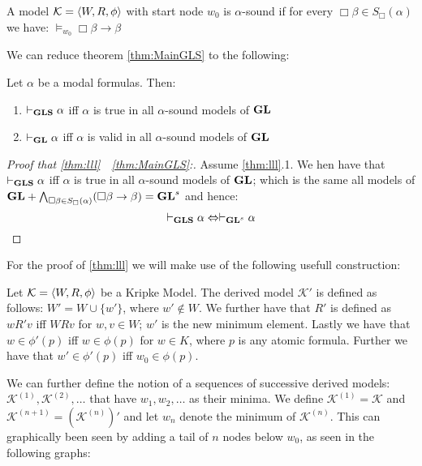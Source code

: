 \documentclass[../main.tex]{subfiles}
\begin{document}
\begin{defi}
	A model $\mathcal{K}=\langle W,R,\phi\rangle$ with start node $w_0$ is $\alpha$-sound if for every
	$\Box\beta\in S_\Box(\alpha)$  we have:
	$\vDash_{w_0}\Box\beta\rightarrow\beta$
\end{defi}
We can reduce theorem \ref{thm:MainGLS} to the following:
\begin{thm}
	\label{thm:lll}
	Let $\alpha$ be a modal formulas. Then:
	\begin{enumerate}
		\item $\vdash_{\text{\textbf{GLS}}}\alpha$ iff $\alpha$ is true in all
			$\alpha$-sound models of $\text{\textbf{GL}}$
		\item $\vdash_{\text{\textbf{GL}}}\alpha$ iff $\alpha$ is valid in all
			$\alpha$-sound models of $\text{\textbf{GL}}$
	\end{enumerate}
\end{thm}
\begin{proof}[Proof that \ref{thm:lll}\ \Rightarrow\ \ref{thm:MainGLS}:]
	Assume \ref{thm:lll}.1. We hen have that $\vdash_{\text{\textbf{GLS}}}\alpha$ iff $\alpha$ is true in all
	$\alpha$-sound models of $\text{\textbf{GL}}$; which is the same all models of
	$\text{\textbf{GL}}+\bigwedge_{\Box\beta\in S_\Box(\alpha)}(\Box\beta\rightarrow\beta)=\text{\textbf{GL}}^s$ and hence:
	$$\vdash_{\text{\textbf{GLS}}}\alpha\Leftrightarrow\vdash_{\text{\textbf{GL}}^s}\alpha$$
\end{proof}

For the proof of \ref{thm:lll} we will make use of the following usefull
construction:

\begin{defi}
	Let $\mathcal{K}=\langle W,R,\phi\rangle$ be a Kripke Model. The derived model
	$\mathcal{K'}$ is defined as follows: $W'=W\cup \{w'\}$, where
	$w'\not\in W$. We further have that $R'$ is defined as $wR'v$ iff $WRv$
	for $w,v\in W$; $w'$ is the new minimum element. Lastly we have that
	$w\in\phi'(p)$ iff $w\in\phi(p)$ for $w\in K$, where $p$ is any atomic
	formula. Further we have that $w'\in\phi'(p)$ iff $w_0\in\phi(p)$.
\end{defi}
We can further define the notion of a sequences of successive derived models:
$\mathcal{K}^{(1)},\mathcal{K}^{(2)},\ldots$ that have $w_1,w_2,\ldots$ as
their minima. We define $\mathcal{K}^{(1)}=\mathcal{K}$ and
$\mathcal{K}^{(n+1)}=(\mathcal{K}^{(n)})'$ and let $w_n$ denote the minimum of
$\mathcal{K}^{(n)}$. This can graphically been seen by adding a tail of $n$
nodes below $w_0$, as seen in the following graphs:
\end{document}
